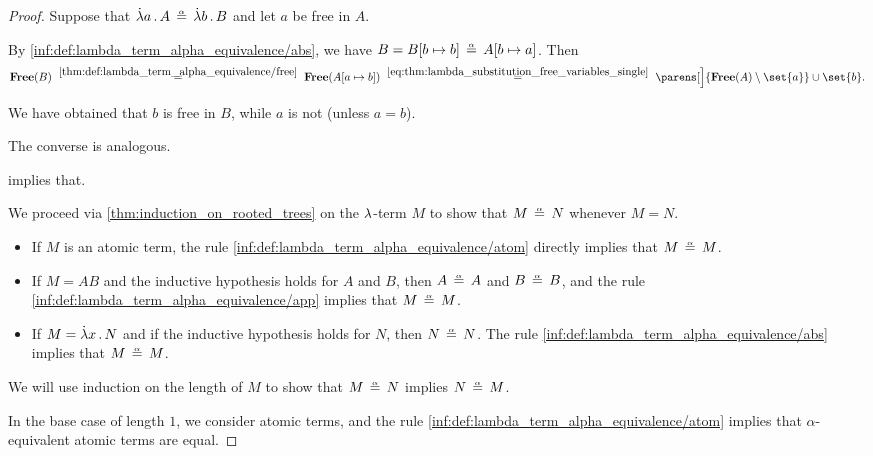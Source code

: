 \begin{proof}

  \SufficiencySubProof* Suppose that \( \qabs a A \aequiv \qabs b B \) and let \( a \) be free in \( A \).

  By \ref{inf:def:lambda_term_alpha_equivalence/abs}, we have \( B = B[b \mapsto b] \aequiv A[b \mapsto a] \). Then
  \begin{equation*}
    \op*{Free}(B)
    \reloset {\ref{thm:def:lambda_term_alpha_equivalence/free}} =
    \op*{Free}(A[a \mapsto b])
    \reloset {\eqref{eq:thm:lambda_substitution_free_variables_single}} =
    \parens[\Big]{ \op*{Free}(A) \setminus \set{ a } } \cup \set{ b }.
  \end{equation*}

  We have obtained that \( b \) is free in \( B \), while \( a \) is not (unless \( a = b \)).

  \NecessitySubProof* The converse is analogous.

   implies that.


   We proceed via \cref{thm:induction_on_rooted_trees} on the \( {\mathrm \lambda} \)-term \( M \) to show that \( M \aequiv N \) whenever \( M = N \).
  \begin{itemize}
    \item If \( M \) is an atomic term, the rule \ref{inf:def:lambda_term_alpha_equivalence/atom} directly implies that \( M \aequiv M \).
    \item If \( M = AB \) and the inductive hypothesis holds for \( A \) and \( B \), then \( A \aequiv A \) and \( B \aequiv B \), and the rule \ref{inf:def:lambda_term_alpha_equivalence/app} implies that \( M \aequiv M \).
    \item If \( M = \qabs x N \) and if the inductive hypothesis holds for \( N \), then \( N \aequiv N \). The rule \ref{inf:def:lambda_term_alpha_equivalence/abs} implies that \( M \aequiv M \).
  \end{itemize}

   We will use induction on the length of \( M \) to show that \( M \aequiv N \) implies \( N \aequiv M \).

  In the base case of length \( 1 \), we consider atomic terms, and the rule \ref{inf:def:lambda_term_alpha_equivalence/atom} implies that \( \alpha \)-equivalent atomic terms are equal.


\end{proof}
